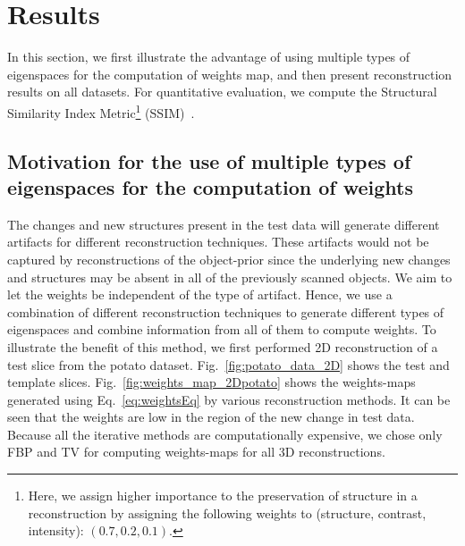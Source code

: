 \documentclass[journal]{IEEEtran}
\begin{document}
\section{Results}
\label{sec:results_spatially_varying_prior}


In this section, we first illustrate the advantage of using multiple types of eigenspaces for the computation of weights map, and then present reconstruction results on all datasets. For quantitative evaluation, we compute the Structural Similarity Index Metric\footnote{Here, we assign higher importance to the preservation of structure in a reconstruction by assigning the following weights to (structure, contrast, intensity): $(0.7,0.2,0.1)$.} (SSIM)~\cite{ssim}.


\subsection{Motivation for the use of multiple types of eigenspaces for the computation of weights}

The changes and new structures present in the test data will generate
different artifacts for different reconstruction techniques. These
artifacts would not be captured by reconstructions of the object-prior
since the underlying new changes and structures may be absent in all
of the previously scanned objects. We aim to let the weights be
independent of the type of artifact. Hence, we use a combination of
different reconstruction techniques to generate different types of
eigenspaces and combine information from all of them to compute
weights. To illustrate the benefit of this method, we first performed
2D reconstruction of a test slice from the potato dataset.
Fig.~\ref{fig:potato_data_2D} shows the test and template
slices. Fig.~\ref{fig:weights_map_2Dpotato} shows the weights-maps
generated using Eq.~\ref{eq:weightsEq} by various reconstruction
methods. It can be seen that the weights are low in the region of the
new change in test data. Because all the iterative methods are
computationally expensive, we chose only FBP and TV for
computing weights-maps for all 3D reconstructions.
\end{document}
